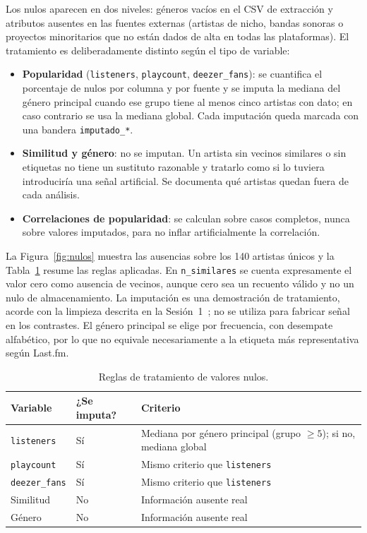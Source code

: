 Los nulos aparecen en dos niveles: géneros vacíos en el CSV de extracción y atributos ausentes en las fuentes externas (artistas de nicho, bandas sonoras o proyectos minoritarios que no están dados de alta en todas las plataformas). El tratamiento es deliberadamente distinto según el tipo de variable:

\begin{itemize}
    \item \textbf{Popularidad} (\texttt{listeners}, \texttt{playcount}, \texttt{deezer\_fans}): se cuantifica el porcentaje de nulos por columna y por fuente y se imputa la mediana del género principal cuando ese grupo tiene al menos cinco artistas con dato; en caso contrario se usa la mediana global. Cada imputación queda marcada con una bandera \texttt{imputado\_*}.
    \item \textbf{Similitud y género}: no se imputan. Un artista sin vecinos similares o sin etiquetas no tiene un sustituto razonable y tratarlo como si lo tuviera introduciría una señal artificial. Se documenta qué artistas quedan fuera de cada análisis.
    \item \textbf{Correlaciones de popularidad}: se calculan sobre casos completos, nunca sobre valores imputados, para no inflar artificialmente la correlación.
\end{itemize}

La Figura~\ref{fig:nulos} muestra las ausencias sobre los 140 artistas únicos y la Tabla~\ref{tab:nulos-reglas} resume las reglas aplicadas. En \texttt{n\_similares} se cuenta expresamente el valor cero como ausencia de vecinos, aunque cero sea un recuento válido y no un nulo de almacenamiento. La imputación es una demostración de tratamiento, acorde con la limpieza descrita en la Sesión~1~\cite{sesion1}; no se utiliza para fabricar señal en los contrastes. El género principal se elige por frecuencia, con desempate alfabético, por lo que no equivale necesariamente a la etiqueta más representativa según Last.fm.

\begin{table}[H]
    \centering
    \caption{Reglas de tratamiento de valores nulos.}
    \label{tab:nulos-reglas}
    \small
    \begin{tabular}{|p{}|p{}|p{}|}
        \hline
        \textbf{Variable} & \textbf{¿Se imputa?} & \textbf{Criterio} \\
        \hline
        \texttt{listeners} & Sí & Mediana por género principal (grupo $\geq 5$); si no, mediana global \\
        \hline
        \texttt{playcount} & Sí & Mismo criterio que \texttt{listeners} \\
        \hline
        \texttt{deezer\_fans} & Sí & Mismo criterio que \texttt{listeners} \\
        \hline
        Similitud & No & Información ausente real \\
        \hline
        Género & No & Información ausente real \\
        \hline
    \end{tabular}
\end{table}


